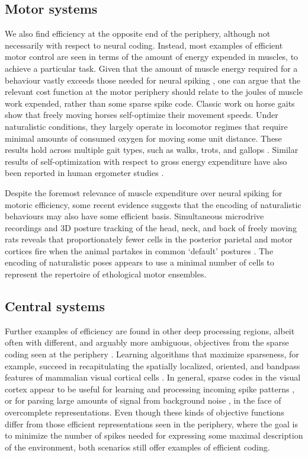 \documentclass[twocolumn]{article}
\begin{document}
\subsection{Motor systems}
We also find efficiency at the opposite end of the periphery, although not necessarily with respect to neural coding. Instead, most examples of efficient motor control are seen in terms of the amount of energy expended in muscles, to achieve a particular task. Given that the amount of muscle energy required for a behaviour vastly exceeds those needed for neural spiking \cite{sengupta_2010, ortega_2015}, one can argue that the relevant cost function at the motor periphery should relate to the joules of muscle work expended, rather than some sparse spike code. Classic work on horse gaits show that freely moving horses self-optimize their movement speeds. Under naturalistic conditions, they largely operate in locomotor regimes that require minimal amounts of consumed oxygen for moving some unit distance. These results hold across multiple gait types, such as walks, trots, and gallops \cite{hoyt_taylor_1981}. Similar results of self-optimization with respect to gross energy expenditure have also been reported in human ergometer studies \cite{sparrow_newell_1998}. 

Despite the foremost relevance of muscle expenditure over neural spiking for motoric efficiency, some recent evidence suggests that the encoding of naturalistic behaviours may also have some efficient basis. Simultaneous microdrive recordings and 3D posture tracking of the head, neck, and back of freely moving rats reveals that proportionately fewer cells in the posterior parietal and motor cortices fire when the animal partakes in common `default' postures \cite{Mimica_Dunn_Tombaz_Bojja_Whitlock_2018}. The encoding of naturalistic poses appears to use a minimal number of cells to represent the repertoire of ethological motor ensembles. 

\subsection{Central systems}
Further examples of efficiency are found in other deep processing regions, albeit often with different, and arguably more ambiguous, objectives from the sparse coding seen at the periphery \cite{simoncelli_2003}. Learning algorithms that maximize sparseness, for example, succeed in recapitulating the spatially localized, oriented, and bandpass features of mammalian visual cortical cells \cite{olshausen_field_1996}. In general, sparse codes in the visual cortex appear to be useful for learning and processing incoming spike patterns \cite{olshausen_field_1996}, or for parsing large amounts of signal from background noise \cite{ringach_malone_2007}, in the face of overcomplete representations. Even though these kinds of objective functions differ from those efficient representations seen in the periphery, where the goal is to minimize the number of spikes needed for expressing some maximal description of the environment, both scenarios still offer examples of efficient coding. 
\end{document}
